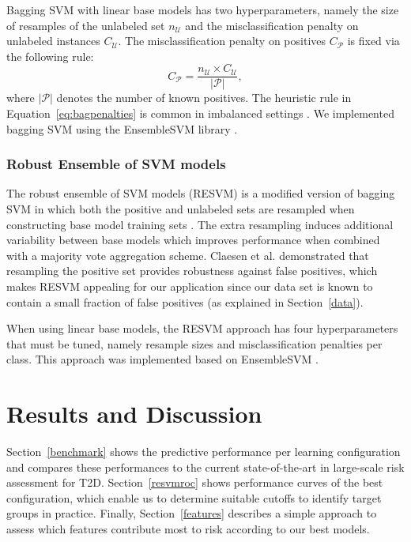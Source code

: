 Bagging SVM with linear base models has two hyperparameters, namely the size of resamples of the unlabeled set $n_\mathcal{U}$ and the misclassification penalty on unlabeled instances $C_\mathcal{U}$. The misclassification penalty on positives $C_\mathcal{P}$ is fixed via the following rule:
\begin{equation}
C_{\mathcal{P}} = \frac{n_{\mathcal{U}} \times C_{\mathcal{U}}}{|\mathcal{P}|}, \label{eq:bagpenalties}
\end{equation}
where $|\mathcal{P}|$ denotes the number of known positives. The heuristic rule in Equation~\ref{eq:bagpenalties} is common in imbalanced settings \citep{cawley2006leave,daemen2009kernel}. We implemented bagging SVM using the EnsembleSVM library \citep{JMLR:v15:claesen14a}.

\subsubsection{Robust Ensemble of SVM models}
The robust ensemble of SVM models (RESVM) is a modified version of bagging SVM in which both the positive and unlabeled sets are resampled when constructing base model training sets \citep{Claesen2015resvm}. The extra resampling induces additional variability between base models which improves performance when combined with a majority vote aggregation scheme. Claesen et al. \citep{Claesen2015resvm} demonstrated that resampling the positive set provides robustness against false positives, which makes RESVM appealing for our application since our data set is known to contain a small fraction of false positives (as explained in Section~\ref{data}).

When using linear base models, the RESVM approach has four hyperparameters that must be tuned, namely resample sizes and misclassification penalties per class. This approach was implemented based on EnsembleSVM \citep{JMLR:v15:claesen14a}.


%
%

\section{Results and Discussion}
Section~\ref{benchmark} shows the predictive performance per learning configuration and compares these performances to the current state-of-the-art in large-scale risk assessment for T2D. Section~\ref{resvmroc} shows performance curves of the best configuration, which enable us to determine suitable cutoffs to identify target groups in practice. Finally, Section~\ref{features} describes a simple approach to assess which features contribute most to risk according to our best models.

